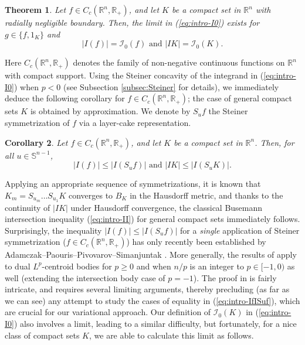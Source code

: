 \documentclass[11pt]{article}
\newtheorem{thm}{Theorem}[section]
\newtheorem{cor}[thm]{Corollary}
\theoremstyle{definition}
\theoremstyle{proof}
\DeclareMathOperator{\+}{\mathop{\tilde{+}}}
\newcommand{\R}{\mathbb{R}}
\renewcommand{\S}{\mathbb{S}}
\newcommand{\I}{\mathcal{I}}
\numberwithin{equation}{section}
\numberwithin{equation}{section}
\begin{document}
\begin{thm} \label{thm:intro-I0K}
Let $f \in C_c(\R^n,\R_+)$, and let $K$ be a compact set in $\R^n$ with radially negligible boundary. Then, the limit in (\ref{eq:intro-I0}) exists for $g \in \{ f , 1_K \}$ and
\[
|I(f)| = \I_0(f) \text{ and } |I K| = \I_0(K) .
\]
\end{thm}

Here $C_c(\R^n,\R_+)$ denotes the family of non-negative continuous functions on $\R^n$ with compact support. 
Using the Steiner concavity of the integrand in (\ref{eq:intro-I0}) when $p < 0$ (see Subsection \ref{subsec:Steiner} for details), we immediately deduce the following corollary for $f \in C_c(\R^n,\R_+)$; the case of general compact sets $K$ is obtained by approximation.  We denote by $S_u f$ the Steiner symmetrization of $f$ via a layer-cake representation. 
\begin{cor} \label{cor:intro-SuK}
Let $f \in C_c(\R^n,\R_+)$, and let $K$ be a compact set in $\R^n$. Then, for all $u \in \S^{n-1}$,
\begin{equation} \label{eq:intro-IfISuf}
|I(f)| \leq |I(S_u f)| \text{ and } |I K| \leq |I (S_u K)| . 
\end{equation}
\end{cor}

Applying an appropriate sequence of symmetrizations, it is known \cite[Lemma 9.4.3]{BuragoZalgallerBook} that $K_m = S_{u_m}\ldots S_{u_1} K$ converges to $B_K$ in the Hausdorff metric, and thanks to the continuity of $|I K|$ under Hausdorff convergence,
the classical Busemann intersection inequality (\ref{eq:intro-II}) for general compact sets immediately follows. Surprisingly, the inequality $|I(f)| \leq |I(S_u f)|$ for a \emph{single} application of Steiner symmetrization ($f \in C_c(\R^n,\R_+)$) has only recently been established by Adamczak--Paouris--Pivovarov--Simanjuntak \cite{APPS-LpCentroidBodies}. More generally, the results of \cite{APPS-LpCentroidBodies} apply to dual $L^p$-centroid bodies for $p \geq 0$ and when $n/p$ is an integer to $p \in [-1,0)$ as well (extending the intersection body case of $p=-1$). The proof in \cite{APPS-LpCentroidBodies} is fairly intricate, and requires several limiting arguments, thereby precluding (as far as we can see) any attempt to study the cases of equality in (\ref{eq:intro-IfISuf}), which are crucial for our variational approach. Our definition of $\I_0(K)$ in (\ref{eq:intro-I0}) also involves a limit, leading to a similar difficulty, but fortunately, for a nice class of compact sets $K$, we are able to calculate this limit as follows. 
\end{document}
